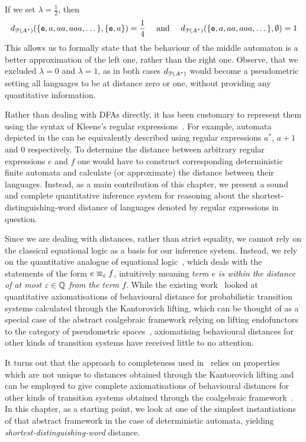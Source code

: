 If we set $\lambda = \frac{1}{2}$, then
\begin{gather*}
	d_{\mathcal{P}({A}^{\ast})}(\{\mathtt{e}, a, aa, aaa, \dots\}, \{\mathtt{e}, a\}) = \frac{1}{4} \quad \text{ and } \quad d_{\mathcal{P}({A}^{\ast})}(\{\mathtt{e},a,aa,aaa, \dots\}, \emptyset)=1
\end{gather*}
This allows us to formally state that the behaviour of the middle automaton is a better approximation of the left one, rather than the right one. Observe, that we excluded $\lambda=0$ and $\lambda=1$, as in both cases $d_{\mathcal{P}({A}^{\ast})}$ would become a pseudometric setting all languages to be at distance zero or one, without providing any quantitative information. 

Rather than dealing with DFAs directly, it has been customary to represent them using the syntax of Kleene's regular expressions~\cite{Kleene:1951:Representation}. For example,  automata depicted in the  can be equivalently described using regular expressions $a^*$, $a + 1$ and $0$ respectively.  To determine the distance between arbitrary regular expressions $e$ and $f$ one would have to construct corresponding deterministic finite automata and calculate (or approximate) the distance between their languages. Instead, as a main contribution of this chapter, we present a sound and complete quantitative inference system for reasoning about the shortest-distinguishing-word distance of languages denoted by regular expressions in question.

Since we are dealing with distances, rather than strict equality, we cannot rely on the classical equational logic as a basis for our inference system. Instead, we rely on the quantitative analogue of equational logic~\cite{Mardare:2016:Quantitative}, which deals with the statements of the form $e \equiv_{\varepsilon} f$, intuitively meaning \emph{term $e$ is within the distance of at most $\varepsilon \in \mathbb{Q}$ from the term $f$}. While the existing work~\cite{Bacci:2018:Algebraic,Bacci:2018:Bisimilarity,Bacci:2018:TV} looked at quantitative axiomatisations of behavioural distance for probabilistic transition systems calculated through the Kantorovich lifting, which can be thought of as a special case of the abstract coalgebraic framework relying on lifting endofunctors to the category of pseudometric spaces~\cite{Baldan:2018:Coalgebraic}, axiomatising behavioural distances for other kinds of transition systems have received little to no attention.

It turns out that the approach to completeness used in~\cite{Bacci:2018:Bisimilarity} relies on properties which are not unique to distances obtained through the Kantorovich lifting and can be employed to give complete axiomatisations of behavioural distances for other kinds of transition systems obtained through the coalgebraic framework~\cite{Baldan:2018:Coalgebraic}. In this chapter, as a starting point, we look at one of the simplest instantiations of that abstract framework in the case of deterministic automata, yielding \emph{shortest-distinguishing-word} distance. 

